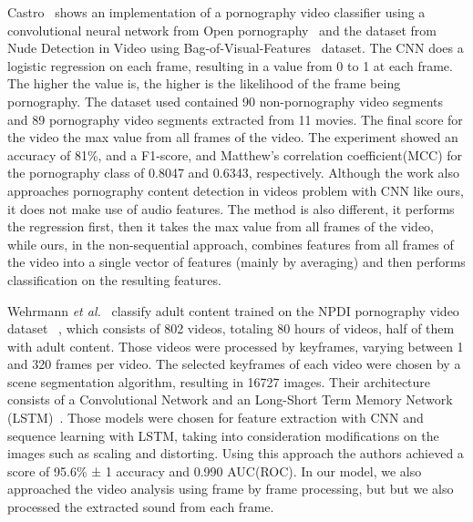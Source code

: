 Castro~\cite{torres2018automatic} shows an implementation of a pornography video classifier using a convolutional neural network from Open pornography~\cite{mahadeokar2016open} and the dataset from Nude Detection in Video using Bag-of-Visual-Features~\cite{lopes2009nude} dataset.
The CNN does a logistic regression on each frame, resulting in a value from 0 to 1 at each frame.
The higher the value is, the higher is the likelihood of the frame being pornography.
The dataset used contained 90 non-pornography video segments and 89 pornography video segments extracted from 11 movies.
The final score for the video the max value from all frames of the video.
The experiment showed an accuracy of 81\%, and a F1-score, and Matthew’s correlation coefficient(MCC) for the pornography class of 0.8047 and 0.6343, respectively.
Although the work also approaches pornography content detection in videos problem with CNN like ours, it does not make use of audio features.
The method is also different, it performs the regression first, then it takes the max value from all frames of the video, while ours, in the non-sequential approach, combines features from all frames of the video into a single vector of features (mainly by averaging) and then performs classification on the resulting features.

Wehrmann \textit{et al.}~\cite{wehrmann2018adult} classify adult content trained on the NPDI pornography video dataset ~\cite{avila2013pooling}, which consists of 802 videos, totaling 80 hours of videos, half of them with adult content.
Those videos were processed by keyframes, varying between 1 and 320 frames per video.
The selected keyframes of each video were chosen by a scene segmentation algorithm, resulting in 16727 images. %
Their architecture consists of a Convolutional Network and an Long-Short Term Memory Network (LSTM)~\cite{hochreiter1997long}.
Those models were chosen for feature extraction with CNN and sequence learning with LSTM, taking into consideration modifications on the images such as scaling and distorting.
Using this approach the authors achieved a score of 95.6\% ± 1 accuracy and 0.990 AUC(ROC).
In our model, we also approached the video analysis using frame by frame processing, but but we also processed the extracted sound from each frame.%

